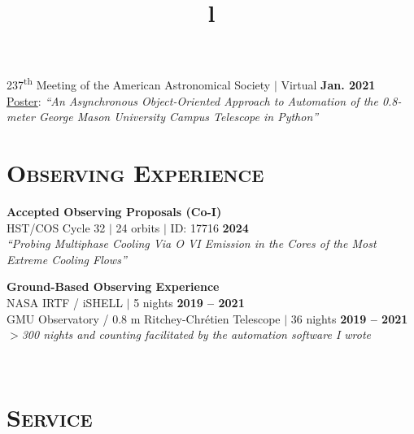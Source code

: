\documentclass[marg, centered]{res}
\begin{document}
\begin{resume}
\begin{talks}[itemindent=0pt, leftmargin=19pt]
\item 237\textsuperscript{th} Meeting of the American Astronomical Society $|$ Virtual \hfill \textbf{Jan. 2021}\\
\href{https://ui.adsabs.harvard.edu/abs/2021AAS...23734407R/abstract}{\color{dkbu} Poster}: \textit{``An Asynchronous Object-Oriented Approach to Automation of the 0.8-meter George Mason University Campus Telescope in Python''}

\end{talks}


\section{{\scshape \bfseries Observing Experience}}

\textbf{Accepted Observing Proposals (Co-I)} \\
HST/COS Cycle 32 $|$ 24 orbits $|$ ID: 17716 \hfill \textbf{2024} \\
\textit{``Probing Multiphase Cooling Via O VI Emission in the Cores of the Most Extreme Cooling Flows''}

\textbf{Ground-Based Observing Experience} \\
NASA IRTF / iSHELL $|$ 5 nights \hfill \textbf{2019 -- 2021} \\
GMU Observatory / 0.8 m Ritchey-Chr\'etien Telescope $|$ 36 nights \hfill \textbf{2019 -- 2021} \\
\vspace{-0.5cm}
\quad \textit{$>$300 nights and counting facilitated by the automation software I wrote}
\vspace{0.5cm}


\begin{format}
\title{l} \\
\body
\end{format}

\section{{\scshape \bfseries Service}}


\end{resume}
\end{document}
